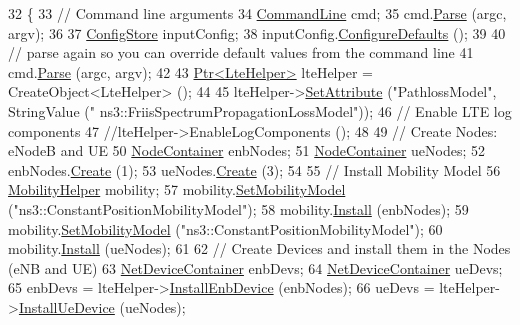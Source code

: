\begin{DoxyCode}
32 \{
33   \textcolor{comment}{// Command line arguments}
34   \hyperlink{classns3_1_1CommandLine}{CommandLine} cmd;
35   cmd.\hyperlink{classns3_1_1CommandLine_a5c10b85b3207e5ecb48d907966923156}{Parse} (argc, argv);
36 
37   \hyperlink{classns3_1_1ConfigStore}{ConfigStore} inputConfig;
38   inputConfig.\hyperlink{classns3_1_1ConfigStore_a0a6137574d7c847c3823af8b9d1bb886}{ConfigureDefaults} ();
39 
40   \textcolor{comment}{// parse again so you can override default values from the command line}
41   cmd.\hyperlink{classns3_1_1CommandLine_a5c10b85b3207e5ecb48d907966923156}{Parse} (argc, argv);
42 
43   \hyperlink{classns3_1_1Ptr}{Ptr<LteHelper>} lteHelper = CreateObject<LteHelper> ();
44 
45   lteHelper->\hyperlink{classns3_1_1ObjectBase_ac60245d3ea4123bbc9b1d391f1f6592f}{SetAttribute} (\textcolor{stringliteral}{"PathlossModel"}, StringValue (\textcolor{stringliteral}{"
      ns3::FriisSpectrumPropagationLossModel"}));
46   \textcolor{comment}{// Enable LTE log components}
47   \textcolor{comment}{//lteHelper->EnableLogComponents ();}
48 
49   \textcolor{comment}{// Create Nodes: eNodeB and UE}
50   \hyperlink{classns3_1_1NodeContainer}{NodeContainer} enbNodes;
51   \hyperlink{classns3_1_1NodeContainer}{NodeContainer} ueNodes;
52   enbNodes.\hyperlink{classns3_1_1NodeContainer_a787f059e2813e8b951cc6914d11dfe69}{Create} (1);
53   ueNodes.\hyperlink{classns3_1_1NodeContainer_a787f059e2813e8b951cc6914d11dfe69}{Create} (3);
54 
55   \textcolor{comment}{// Install Mobility Model}
56   \hyperlink{classns3_1_1MobilityHelper}{MobilityHelper} mobility;
57   mobility.\hyperlink{classns3_1_1MobilityHelper_a030275011b6f40682e70534d30280aba}{SetMobilityModel} (\textcolor{stringliteral}{"ns3::ConstantPositionMobilityModel"});
58   mobility.\hyperlink{classns3_1_1MobilityHelper_a07737960ee95c0777109cf2994dd97ae}{Install} (enbNodes);
59   mobility.\hyperlink{classns3_1_1MobilityHelper_a030275011b6f40682e70534d30280aba}{SetMobilityModel} (\textcolor{stringliteral}{"ns3::ConstantPositionMobilityModel"});
60   mobility.\hyperlink{classns3_1_1MobilityHelper_a07737960ee95c0777109cf2994dd97ae}{Install} (ueNodes);
61 
62   \textcolor{comment}{// Create Devices and install them in the Nodes (eNB and UE)}
63   \hyperlink{classns3_1_1NetDeviceContainer}{NetDeviceContainer} enbDevs;
64   \hyperlink{classns3_1_1NetDeviceContainer}{NetDeviceContainer} ueDevs;
65   enbDevs = lteHelper->\hyperlink{classns3_1_1LteHelper_a5e009ad35ef85f46b5a6099263f15a03}{InstallEnbDevice} (enbNodes);
66   ueDevs = lteHelper->\hyperlink{classns3_1_1LteHelper_ac9cd932d7de92811cfa953c2e3b2fc9f}{InstallUeDevice} (ueNodes);

\end{DoxyCode}
